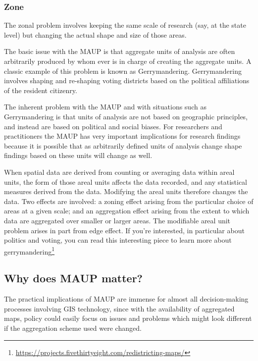 \documentclass[
]{book}
\renewcommand{\href}[2]{#2\footnote{\url{#1}}}
\begin{document}
\hypertarget{zone}{%
\subsubsection{Zone}\label{zone}}

The zonal problem involves keeping the same scale of research (say, at the state level) but changing the actual shape and size of those areas.

The basic issue with the MAUP is that aggregate units of analysis are often arbitrarily produced by whom ever is in charge of creating the aggregate units. A classic example of this problem is known as Gerrymandering. Gerrymandering involves shaping and re-shaping voting districts based on the political affiliations of the resident citizenry.

The inherent problem with the MAUP and with situations such as Gerrymandering is that units of analysis are not based on geographic principles, and instead are based on political and social biases. For researchers and practitioners the MAUP has very important implications for research findings because it is possible that as arbitrarily defined units of analysis change shape findings based on these units will change as well.

When spatial data are derived from counting or averaging data within areal units, the form of those areal units affects the data recorded, and any statistical measures derived from the data. Modifying the areal units therefore changes the data. Two effects are involved: a zoning effect arising from the particular choice of areas at a given scale; and an aggregation effect arising from the extent to which data are aggregated over smaller or larger areas. The modifiable areal unit problem arises in part from edge effect. If you're interested, in particular about politics and voting, you can read this interesting piece to learn \href{https://projects.fivethirtyeight.com/redistricting-maps/}{more about gerrymandering}

\hypertarget{why-does-maup-matter}{%
\subsection{Why does MAUP matter?}\label{why-does-maup-matter}}

The practical implications of MAUP are immense for almost all decision-making processes involving GIS technology, since with the availability of aggregated maps, policy could easily focus on issues and problems which might look different if the aggregation scheme used were changed.
\end{document}
